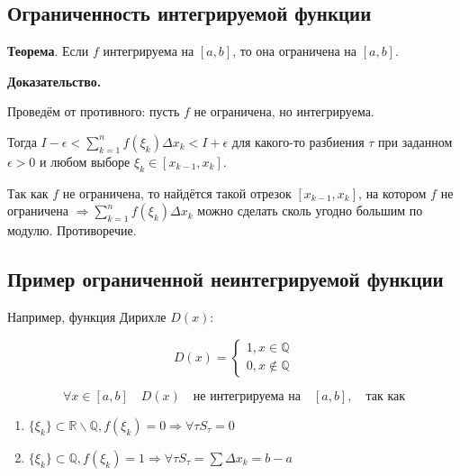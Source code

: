 \documentclass[a4paper]{article}
\begin{document}
\begin{definit}
\subsection*{Ограниченность интегрируемой функции}

\begin{htheorem}\textbf{Теорема}.
Если $f$ интегрируема на $[a,b]$, то она ограничена на $[a,b]$.

\end{htheorem}

\begin{hproof}\textbf{Доказательство.}

Проведём от противного: пусть $f$ не ограничена, но интегрируема.

Тогда $I - \epsilon < \sum_{k=1}^n f(\xi_k) \Delta x_k < I + \epsilon$ для какого-то разбиения $\tau$ при заданном $\epsilon > 0$ и любом выборе $\xi_k \in [x_{k-1}, x_k]$.

Так как $f$ не ограничена, то найдётся такой отрезок $[x_{k-1}, x_k]$, на котором $f$ не ограничена $\Rightarrow \sum_{k=1}^n f(\xi_k) \Delta x_k $ можно сделать сколь угодно большим по модулю. Противоречие.
\end{hproof}

\end{definit}


\begin{definit}
\subsection*{Пример ограниченной неинтегрируемой функции}

Например, функция Дирихле $D(x)$:

\[
	D(x) = \begin{cases}
		1, x \in \mathbb{Q} \\
		0, x \notin \mathbb{Q}
	\end{cases}
\]

\[
	\forall x \in [a,b] \quad D(x) \quad \text{не интегрируема на} \quad  [a, b], \quad \text{так как}
\]

\begin{enumerate}
\item $\{ \xi_k \} \subset \mathbb{R} \backslash \mathbb{Q}, f(\xi_k) = 0 \Rightarrow \forall \tau S_\tau = 0$
\item $\{ \xi_k \} \subset \mathbb{Q}, f(\xi_k) = 1 \Rightarrow \forall \tau S_\tau = \sum \Delta x_k = b - a$
\end{enumerate}
\end{definit}
\end{document}
